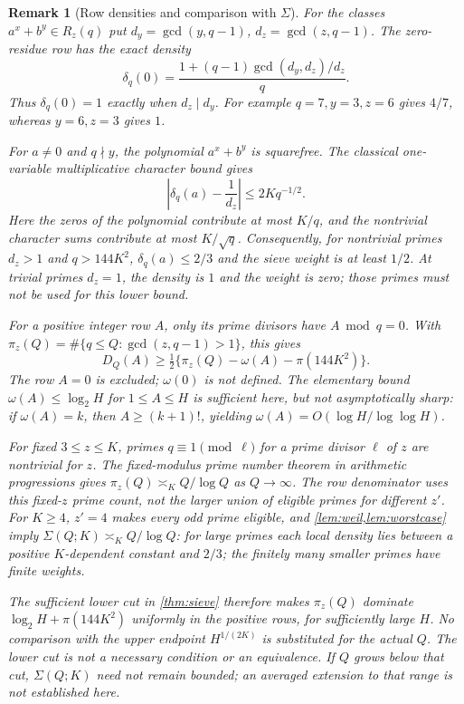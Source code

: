 \documentclass[11pt,a4paper]{article}
\newtheorem{remark}[theorem]{Remark}
\begin{document}
\begin{remark}[Row densities and comparison with $\Sigma$]
\label{rem:Sigma-comparison}
For the classes $a^x+b^y\in R_z(q)$ put $d_y=\gcd(y,q-1)$,
$d_z=\gcd(z,q-1)$. The zero-residue row has the exact density
\[
 \delta_q(0)=
 \frac{1+(q-1)\gcd(d_y,d_z)/d_z}{q}.
\]
Thus $\delta_q(0)=1$ exactly when $d_z\mid d_y$.
For example $q=7,y=3,z=6$ gives $4/7$, whereas $y=6,z=3$ gives $1$.

For $a\ne0$ and $q\nmid y$, the polynomial $a^x+b^y$ is squarefree.
The classical one-variable multiplicative character bound gives
\[
 \left|\delta_q(a)-\frac1{d_z}\right|\le2Kq^{-1/2}.
\]
Here the zeros of the polynomial contribute at most $K/q$, and the
nontrivial character sums contribute at most $K/\sqrt q$.
Consequently, for \emph{nontrivial} primes $d_z>1$ and
$q>144K^2$, $\delta_q(a)\le2/3$ and the sieve weight is at least
$1/2$. At trivial primes $d_z=1$, the density is $1$ and the weight
is zero; those primes must not be used for this lower bound.

For a positive integer row $A$, only its prime divisors have
$A\bmod q=0$. With
$\pi_z(Q)=\#\{q\le Q:\gcd(z,q-1)>1\}$, this gives
\[
 D_Q(A)\ge
 \tfrac12\{\pi_z(Q)-\omega(A)-\pi(144K^2)\}.
\]
The row $A=0$ is excluded; $\omega(0)$ is not defined.
The elementary bound $\omega(A)\le\log_2 H$ for $1\le A\le H$
is sufficient here, but not asymptotically sharp: if $\omega(A)=k$,
then $A\ge(k+1)!$, yielding
$\omega(A)=O(\log H/\log\log H)$.

For fixed $3\le z\le K$, primes $q\equiv1\pmod{\ell}$ for a prime
divisor $\ell$ of $z$ are nontrivial for $z$.
The fixed-modulus prime number theorem in arithmetic progressions
\cite[Theorem~4.12]{KedlayaANT} gives
$\pi_z(Q)\asymp_K Q/\log Q$ as $Q\to\infty$.
The row denominator uses this \emph{fixed-$z$} prime count, not the
larger union of eligible primes for different $z'$.
For $K\ge4$, $z'=4$ makes every odd prime eligible, and
\cref{lem:weil,lem:worstcase} imply
$\Sigma(Q;K)\asymp_K Q/\log Q$: for large primes each local
density lies between a positive $K$-dependent constant and $2/3$;
the finitely many smaller primes have finite weights.

The sufficient lower cut in \cref{thm:sieve} therefore makes
$\pi_z(Q)$ dominate $\log_2 H+\pi(144K^2)$ uniformly in the
positive rows, for sufficiently large $H$. No comparison with the
upper endpoint $H^{1/(2K)}$ is substituted for the actual $Q$.
The lower cut is not a necessary condition or an equivalence.
If $Q$ grows below that cut, $\Sigma(Q;K)$ need not remain bounded;
an averaged extension to that range is not established here.
\end{remark}
\end{document}
